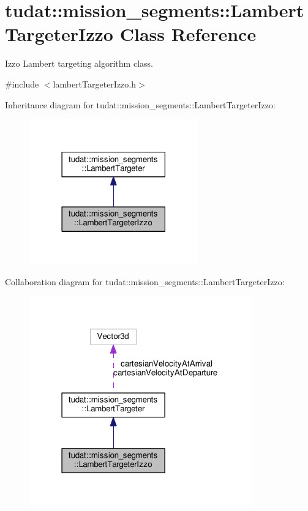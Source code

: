 \hypertarget{classtudat_1_1mission__segments_1_1LambertTargeterIzzo}{}\section{tudat\+:\+:mission\+\_\+segments\+:\+:Lambert\+Targeter\+Izzo Class Reference}
\label{classtudat_1_1mission__segments_1_1LambertTargeterIzzo}


Izzo Lambert targeting algorithm class.  




{\ttfamily \#include $<$lambert\+Targeter\+Izzo.\+h$>$}



Inheritance diagram for tudat\+:\+:mission\+\_\+segments\+:\+:Lambert\+Targeter\+Izzo\+:
\nopagebreak
\begin{figure}[H]
\begin{center}
\leavevmode
\includegraphics[width=206pt]{classtudat_1_1mission__segments_1_1LambertTargeterIzzo__inherit__graph}
\end{center}
\end{figure}


Collaboration diagram for tudat\+:\+:mission\+\_\+segments\+:\+:Lambert\+Targeter\+Izzo\+:
\nopagebreak
\begin{figure}[H]
\begin{center}
\leavevmode
\includegraphics[width=271pt]{classtudat_1_1mission__segments_1_1LambertTargeterIzzo__coll__graph}
\end{center}
\end{figure}

